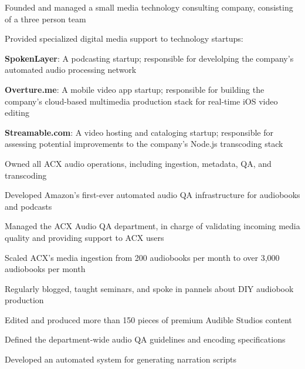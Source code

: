 \documentclass[letterpaper]{deedy-resume} %
\begin{document}
\begin{minipage}[t]{0.66\textwidth}
\begin{tightitemize}
\item Founded and managed a small media technology consulting company, consisting of a three person team
\item Provided specialized digital media support to technology startups:
\item \textbf{SpokenLayer}: A podcasting startup; responsible for develolping the company's automated audio processing network
\item \textbf{Overture.me}: A mobile video app startup; responsible for building the company's cloud-based multimedia production stack for real-time iOS video editing
\item \textbf{Streamable.com}: A video hosting and cataloging startup; responsible for assessing potential improvements to the company's Node.js transcoding stack
\end{tightitemize}



\begin{tightitemize}
\item Owned all ACX audio operations, including ingestion, metadata, QA, and transcoding
\item Developed Amazon's first-ever automated audio QA infrastructure for audiobooks and podcasts
\item Managed the ACX Audio QA department, in charge of validating incoming media quality and providing support to ACX users
\item Scaled ACX's media ingestion from 200 audiobooks per month to over 3,000 audiobooks per month
\item Regularly blogged, taught seminars, and spoke in pannels about DIY audiobook production
\end{tightitemize}



\begin{tightitemize}
\item Edited and produced more than 150 pieces of premium Audible Studios content
\item Defined the department-wide audio QA guidelines and encoding specifications
\item Developed an automated system for generating narration scripts
\end{tightitemize}

\end{minipage} %
\end{document}
